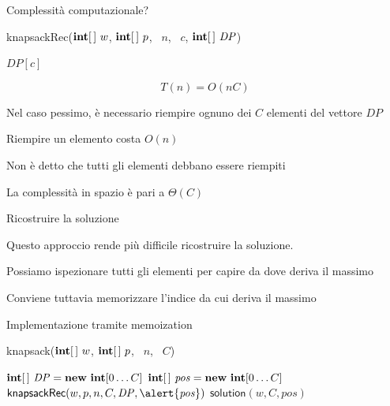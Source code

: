 \begin{frame}{Complessità computazionale?}


\begin{overprint}
\begingroup
\footnotesize
\begin{Procedure}
\caption[A]{\textsf{knapsackRec}($\INTEGER[\,]\ w$, $\INTEGER[\,]\ p$, \INTEGER\ $n$, \INTEGER\ $c$, $\INTEGER[\,]\ \mathit{DP}$)}
\Return $\mathit{DP}[c]$\;
\end{Procedure}
\endgroup
{}

\[ 
  T(n) = O(nC)
\]

\BIL
\item Nel caso pessimo, è necessario riempire ognuno dei $C$ elementi del vettore $\mathit{DP}$
\item Riempire un elemento costa $O(n)$
\EIL
\bigskip
{}
\BIL
\item Non è detto che tutti gli elementi debbano essere riempiti
\item La complessità in spazio è pari a $\Theta(C)$
\EIL
\end{overprint}

\end{frame}


\begin{frame}{Ricostruire la soluzione}

Questo approccio rende più difficile ricostruire la soluzione. 
\BIL
\item Possiamo ispezionare tutti gli elementi per capire da dove 
deriva il massimo
\item Conviene tuttavia memorizzare l'indice da cui deriva il massimo
\EIL

\end{frame}

\begin{frame}{Implementazione tramite memoization}

\vspace{-6pt}
\begin{Procedure}
\caption[A]{\textsf{knapsack}($\INTEGER[\,]\ w$, $\INTEGER[\,]\ p$, \INTEGER\ $n$, \INTEGER\ $C$)}
  $\INTEGER[\,]\ \mathit{DP} = \NEW\ \INTEGER[0 \ldots C]$\;
  \alert{$\INTEGER[\,]\ \mathit{pos} = \NEW\ \INTEGER[0 \ldots C]$}\;
  $\textsf{knapsackRec}(w, p, n, C, \mathit{DP}, \alert{\mathit{pos}})$\;
  \Return \alert{$\textsf{solution}(w,C, \mathit{pos})$}\;
\end{Procedure}
\end{frame}



